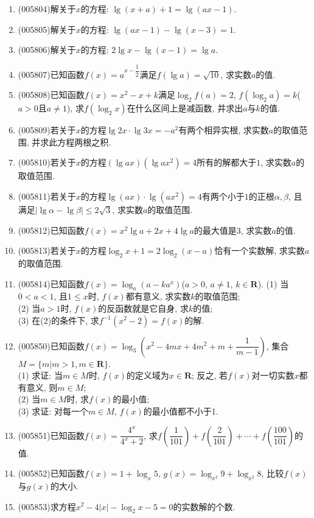 \documentclass[10pt,a4paper]{article}
\begin{document}
\begin{enumerate}[1.]
\item {\tiny (005804)}解关于$x$的方程: $\lg (x+a)+1=\lg (ax-1)$.
\item {\tiny (005805)}解关于$x$的方程: $\lg (ax-1)-\lg (x-3)=1$.
\item {\tiny (005806)}解关于$x$的方程: $2\lg x-\lg (x-1)=\lg a$.
\item {\tiny (005807)}已知函数$f(x)=a^{x-\dfrac 12}$满足$f(\lg a)=\sqrt {10}$, 求实数$a$的值.
\item {\tiny (005808)}已知函数$f(x)=x^2-x+k$满足$\log_2f(a)=2$, $f(\log_2a)=k$($a>0$且$a\ne 1$), 求$f(\log_2x)$在什么区间上是减函数, 并求出$a$与$k$的值.
\item {\tiny (005809)}若关于$x$的方程$\lg 2x\cdot \lg 3x=-a^2$有两个相异实根, 求实数$a$的取值范围, 并求此方程两根之积.
\item {\tiny (005810)}若关于$x$的方程$(\lg ax)(\lg ax^2)=4$所有的解都大于$1$, 求实数$a$的取值范围.
\item {\tiny (005811)}若关于$x$的方程$\lg (ax)\cdot \lg (ax^2)=4$有两个小于$1$的正根$\alpha ,\beta$, 且满足$|\lg \alpha -\lg \beta|\le 2\sqrt 3$, 求实数$a$的取值范围.
\item {\tiny (005812)}已知函数$f(x)=x^2\lg a+2x+4\lg a$的最大值是$3$, 求实数$a$的值.
\item {\tiny (005813)}若关于$x$的方程$\log_2x+1=2\log_2(x-a)$恰有一个实数解, 求实数$a$的取值范围.
\item {\tiny (005814)}已知函数$f(x)=\log_a(a-ka^x)$($a>0$, $a\ne 1$, $k\in \mathbf{R}$).
(1) 当$0<a<1$, 且$1\le x$时, $f(x)$都有意义, 求实数$k$的取值范围;\\
(2) 当$a>1$时, $f(x)$的反函数就是它自身, 求$k$的值;\\
(3) 在(2)的条件下, 求$f^{-1}(x^2-2)=f(x)$的解.
\item {\tiny (005850)}已知函数$f(x)=\log_3(x^2-4mx+4m^2+m+\dfrac 1{m-1})$, 集合$M=\{m|m>1,m\in \mathbf{R}\}$.\\
(1) 求证: 当$m\in M$时, $f(x)$的定义域为$x\in \mathbf{R}$; 反之, 若$f(x)$对一切实数$x$都有意义, 则$m\in M$;\\
(2) 当$m\in M$时, 求$f(x)$的最小值;\\
(3) 求证: 对每一个$m\in M$, $f(x)$的最小值都不小于1.
\item {\tiny (005851)}已知函数$f(x)=\dfrac{4^x}{4^x+2}$, 求$f(\dfrac 1{101})+f(\dfrac 2{101})+\cdots +f(\dfrac{100}{101})$的值.
\item {\tiny (005852)}已知函数$f(x)=1+\log_x5$, $g(x)=\log_{x^2}9+\log_{x^2}8$, 比较$f(x)$与$g(x)$的大小.
\item {\tiny (005853)}求方程$x^2-4|x|-\log_2x-5=0$的实数解的个数.

\end{enumerate}
\end{document}
